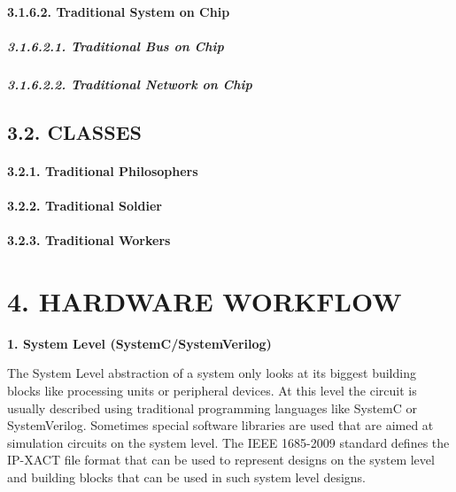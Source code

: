 \documentclass[
]{article}
\begin{document}
\hypertarget{traditional-system-on-chip-1}{%
\paragraph{3.1.6.2. Traditional System on
Chip}\label{traditional-system-on-chip-1}}

\hypertarget{traditional-bus-on-chip-1}{%
\subparagraph{3.1.6.2.1. Traditional Bus on
Chip}\label{traditional-bus-on-chip-1}}

\hypertarget{traditional-network-on-chip-1}{%
\subparagraph{3.1.6.2.2. Traditional Network on
Chip}\label{traditional-network-on-chip-1}}

\hypertarget{classes-1}{%
\subsection{3.2. CLASSES}\label{classes-1}}

\hypertarget{traditional-philosophers-1}{%
\paragraph{3.2.1. Traditional
Philosophers}\label{traditional-philosophers-1}}

\hypertarget{traditional-soldier-1}{%
\paragraph{3.2.2. Traditional Soldier}\label{traditional-soldier-1}}

\hypertarget{traditional-workers-1}{%
\paragraph{3.2.3. Traditional Workers}\label{traditional-workers-1}}

\hypertarget{hardware-workflow-1}{%
\section{4. HARDWARE WORKFLOW}\label{hardware-workflow-1}}

\textbf{1. System Level (SystemC/SystemVerilog)}

The System Level abstraction of a system only looks at its biggest
building blocks like processing units or peripheral devices. At this
level the circuit is usually described using traditional programming
languages like SystemC or SystemVerilog. Sometimes special software
libraries are used that are aimed at simulation circuits on the system
level. The IEEE 1685-2009 standard defines the IP-XACT file format that
can be used to represent designs on the system level and building blocks
that can be used in such system level designs.
\end{document}
